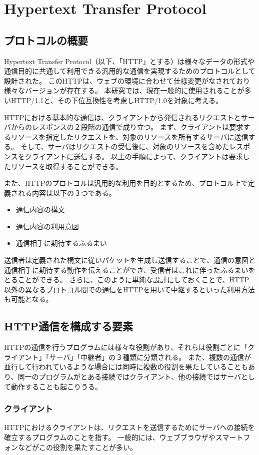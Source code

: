 \documentclass[12pt,a4paper]{jbook}
\begin{document}
\section{Hypertext Transfer Protocol}
\label{sec:http}
\subsection{プロトコルの概要}
Hypertext Transfer Protocol（以下、「HTTP」とする）は様々なデータの形式や通信目的に共通して利用できる汎用的な通信を実現するためのプロトコルとして設計された。
このHTTPは、ウェブの環境に合わせて仕様変更がなされており様々なバージョンが存在する。
本研究では、現在一般的に使用されることが多いHTTP/1.1\cite{rfc7230,rfc7231,rfc7232,rfc7233,rfc7234,rfc7235}と、その下位互換性を考慮しHTTP/1.0\cite{rfc1945}を対象に考える。

HTTPにおける基本的な通信は、クライアントから発信されるリクエストとサーバからのレスポンスの２段階の通信で成り立つ。
まず、クライアントは要求するリソースを指定したリクエストを、対象のリソースを所有するサーバに送信する。
そして、サーバはリクエストの受信後に、対象のリソースを含めたレスポンスをクライアントに送信する。
以上の手順によって、クライアントは要求したリソースを取得することができる。

また、HTTPのプロトコルは汎用的な利用を目的とするため、プロトコル上で定義される内容は以下の３つである。
\begin{itemize}
\item 通信内容の構文
\item 通信内容の利用意図
\item 通信相手に期待するふるまい
\end{itemize}
送信者は定義された構文に従いパケットを生成し送信することで、通信の意図と通信相手に期待する動作を伝えることができ、受信者はこれに伴ったふるまいをとることができる。
さらに、このように単純な設計にしておくことで、HTTP以外の異なるプロトコル間での通信をHTTPを用いて中継するといった利用方法も可能となる。

\subsection{HTTP通信を構成する要素}
HTTPの通信を行うプログラムには様々な役割があり、それらは役割ごとに「クライアント」「サーバ」「中継者」の３種類に分類される。
また、複数の通信が並行して行われているような場合には同時に複数の役割を果たしていることもあり、同一のプログラムがとある接続ではクライアント、他の接続ではサーバとして動作することも起こりうる。

\subsubsection{クライアント}
HTTPにおけるクライアントは、リクエストを送信するためにサーバへの接続を確立するプログラムのことを指す。
一般的には、ウェブブラウザやスマートフォンなどがこの役割を果たすことが多い。
\end{document}
